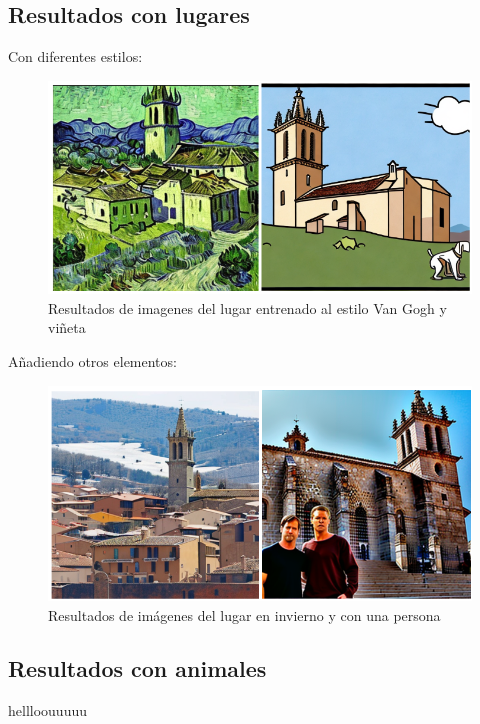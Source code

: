\subsection{Resultados con lugares}

Con diferentes estilos:\\

\begin{figure}[!htb]
	\centering
	\includegraphics[width = 1
	\textwidth]{Imagenes/Vectorial/colmenar_styles.png}
	\caption{Resultados de imagenes del lugar entrenado al estilo Van Gogh y viñeta}
	\label{fig:colmestyles}
\end{figure}


Añadiendo otros elementos:\\


\begin{figure}[!htb]
	\centering
	\includegraphics[width = 1
	\textwidth]{Imagenes/Vectorial/colmenar_elements.png}
	\caption{Resultados de imágenes del lugar en invierno y con una persona}
	\label{fig:elementscolme}
\end{figure}

\subsection{Resultados con animales}
hellloouuuuu\\

